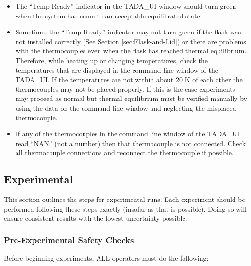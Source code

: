 \begin{enumerate}
  \begin{itemize}
  \tightlist
  \item
    The ``Temp Ready'' indicator in the TADA\_UI window should turn
    green when the system has come to an acceptable equilibrated state
  \item
    Sometimes the ``Temp Ready'' indicator may not turn green if the
    flask was not installed correctly (See Section
    \ref{sec:Flask-and-Lid}) or there are problems with the
    thermocouples even when the flask has reached thermal equilibrium.
    Therefore, while heating up or changing temperatures, check the
    temperatures that are displayed in the command line window of the
    TADA\_UI. If the temperatures are not within about 20 K of each
    other the thermocouples may not be placed properly. If this is the
    case experiments may proceed as normal but thermal equilibrium must
    be verified manually by using the data on the command line window
    and neglecting the misplaced thermocouple.
  \item
    If any of the thermocouples in the command line window of the
    TADA\_UI read ``NAN'' (not a number) then that thermocouple is not
    connected. Check all thermocouple connections and reconnect the
    thermocouple if possible.
  \end{itemize}
\end{enumerate}

\hypertarget{experimental}{%
\subsection{Experimental}\label{experimental}}

This section outlines the steps for experimental runs. Each experiment
should be performed following these steps exactly (insofar as that is
possible). Doing so will ensure consistent results with the lowest
uncertainty possible.

\hypertarget{pre-experimental-safety-checks}{%
\subsubsection{Pre-Experimental Safety
Checks}\label{pre-experimental-safety-checks}}

Before beginning experiments, ALL operators must do the following:

